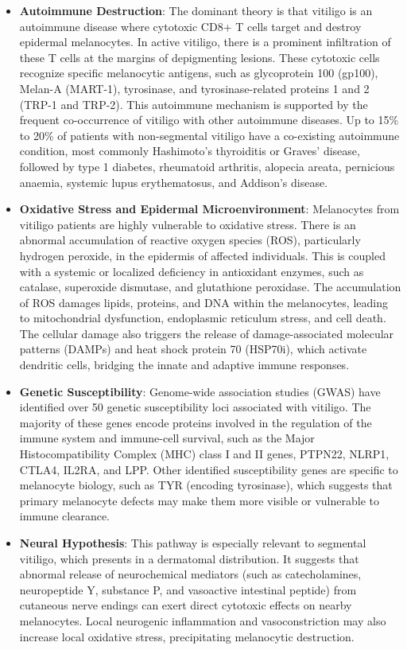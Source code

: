 \begin{itemize}
    \item \textbf{Autoimmune Destruction}: The dominant theory is that vitiligo is an autoimmune disease where cytotoxic CD8+ T cells target and destroy epidermal melanocytes. In active vitiligo, there is a prominent infiltration of these T cells at the margins of depigmenting lesions. These cytotoxic cells recognize specific melanocytic antigens, such as glycoprotein 100 (gp100), Melan-A (MART-1), tyrosinase, and tyrosinase-related proteins 1 and 2 (TRP-1 and TRP-2). This autoimmune mechanism is supported by the frequent co-occurrence of vitiligo with other autoimmune diseases. Up to 15\% to 20\% of patients with non-segmental vitiligo have a co-existing autoimmune condition, most commonly Hashimoto's thyroiditis or Graves' disease, followed by type 1 diabetes, rheumatoid arthritis, alopecia areata, pernicious anaemia, systemic lupus erythematosus, and Addison's disease.
    \item \textbf{Oxidative Stress and Epidermal Microenvironment}: Melanocytes from vitiligo patients are highly vulnerable to oxidative stress. There is an abnormal accumulation of reactive oxygen species (ROS), particularly hydrogen peroxide, in the epidermis of affected individuals. This is coupled with a systemic or localized deficiency in antioxidant enzymes, such as catalase, superoxide dismutase, and glutathione peroxidase. The accumulation of ROS damages lipids, proteins, and DNA within the melanocytes, leading to mitochondrial dysfunction, endoplasmic reticulum stress, and cell death. The cellular damage also triggers the release of damage-associated molecular patterns (DAMPs) and heat shock protein 70 (HSP70i), which activate dendritic cells, bridging the innate and adaptive immune responses.
    \item \textbf{Genetic Susceptibility}: Genome-wide association studies (GWAS) have identified over 50 genetic susceptibility loci associated with vitiligo. The majority of these genes encode proteins involved in the regulation of the immune system and immune-cell survival, such as the Major Histocompatibility Complex (MHC) class I and II genes, PTPN22, NLRP1, CTLA4, IL2RA, and LPP. Other identified susceptibility genes are specific to melanocyte biology, such as TYR (encoding tyrosinase), which suggests that primary melanocyte defects may make them more visible or vulnerable to immune clearance.
    \item \textbf{Neural Hypothesis}: This pathway is especially relevant to segmental vitiligo, which presents in a dermatomal distribution. It suggests that abnormal release of neurochemical mediators (such as catecholamines, neuropeptide Y, substance P, and vasoactive intestinal peptide) from cutaneous nerve endings can exert direct cytotoxic effects on nearby melanocytes. Local neurogenic inflammation and vasoconstriction may also increase local oxidative stress, precipitating melanocytic destruction.

\end{itemize}
